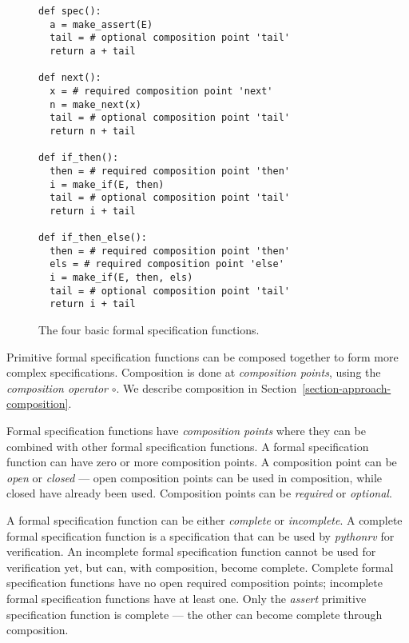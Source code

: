 \begin{figure}[h!]
	\begin{center}
	\begin{minipage}{0.7\textwidth}
	\begin{lstlisting}
def spec():
  a = make_assert(E)
  tail = # optional composition point 'tail'
  return a + tail

def next():
  x = # required composition point 'next'
  n = make_next(x)
  tail = # optional composition point 'tail'
  return n + tail

def if_then():
  then = # required composition point 'then'
  i = make_if(E, then)
  tail = # optional composition point 'tail'
  return i + tail

def if_then_else():
  then = # required composition point 'then'
  els = # required composition point 'else'
  i = make_if(E, then, els)
  tail = # optional composition point 'tail'
  return i + tail
	\end{lstlisting}
	\end{minipage}
	\end{center}

	\caption{The four basic formal specification functions.}
	\label{figure-basic-formal-specification-functions}
\end{figure}

Primitive formal specification functions can be composed together to form more
complex specifications. Composition is done at \textit{composition points},
using the \textit{composition operator} $\circ$. We describe composition in
Section~\ref{section-approach-composition}.

\begin{mydef}\label{def-composition-point}
Formal specification functions have \textit{composition points} where they can
be combined with other formal specification functions. A formal specification
function can have zero or more composition points. A composition point can be
\textit{open} or \textit{closed} --- open composition points can be used in
composition, while closed have already been used. Composition points can be
\textit{required} or \textit{optional}.
\end{mydef}

\begin{mydef}
\label{def-composition-complete}
A formal specification function can be either \textit{complete} or
\textit{incomplete}. A complete formal specification function is a
specification that can be used by \textit{pythonrv} for verification. An
incomplete formal specification function cannot be used for verification yet,
but can, with composition, become complete. Complete formal specification
functions have no open required composition points; incomplete formal
specification functions have at least one. Only the \textit{assert} primitive
specification function is complete --- the other can become complete through
composition.
\end{mydef}

